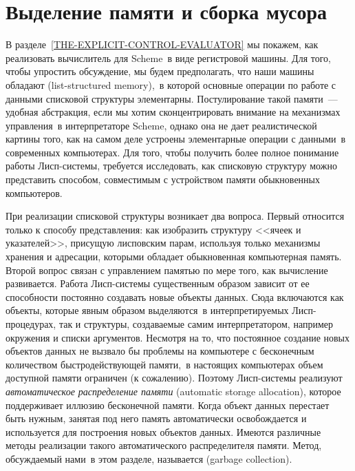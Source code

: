 \section{Выделение памяти и сборка мусора}
\label{STORAGE-ALLOCATION-AND-GARBAGE-COLLECTION}


В разделе~\ref{THE-EXPLICIT-CONTROL-EVALUATOR} мы
покажем, как реализовать вычислитель для Scheme~в виде регистровой
машины. Для того, чтобы упростить обсуждение, мы будем предполагать, что наши
машины обладают 
 (list-structured memory),~в которой основные операции по работе
с данными списковой структуры элементарны.  Постулирование такой
памяти~--- удобная абстракция, если мы хотим сконцентрировать внимание
на механизмах управления~в интерпретаторе Scheme, однако она не
дает реалистической картины того, как на самом деле устроены элементарные
операции с данными~в современных компьютерах.  Для того, чтобы
получить более полное понимание работы Лисп-системы, требуется
исследовать, как списковую структуру можно представить способом,
совместимым с устройством памяти обыкновенных компьютеров.

При реализации списковой структуры возникает два вопроса.
Первый относится только к способу представления: как изобразить
структуру <<ячеек и указателей>>, присущую лисповским парам, используя
только механизмы хранения и адресации, которыми обладает обыкновенная
компьютерная память. Второй вопрос связан с управлением памятью по
мере того, как вычисление развивается.  Работа Лисп-системы
существенным образом зависит от ее способности постоянно создавать
новые объекты данных.  Сюда включаются как объекты, которые явным
образом выделяются~в интерпретируемых Лисп-процедурах, так и
структуры, создаваемые самим интерпретатором, например окружения и
списки аргументов.  Несмотря на то, что постоянное создание новых
объектов данных не вызвало бы проблемы на компьютере с бесконечным
количеством быстродействующей памяти,~в настоящих компьютерах объем
доступной памяти ограничен (к сожалению).  Поэтому
Лисп-системы реализуют
%
%
{\em автоматическое распределение
памяти} (automatic storage allocation), которое поддерживает иллюзию бесконечной памяти.  Когда
объект данных перестает быть нужным, занятая под него память
автоматически освобождается и используется для построения новых
объектов данных.  Имеются различные методы реализации такого
автоматического распределителя памяти.  Метод, обсуждаемый нами~в этом
разделе, называется  (garbage collection).

